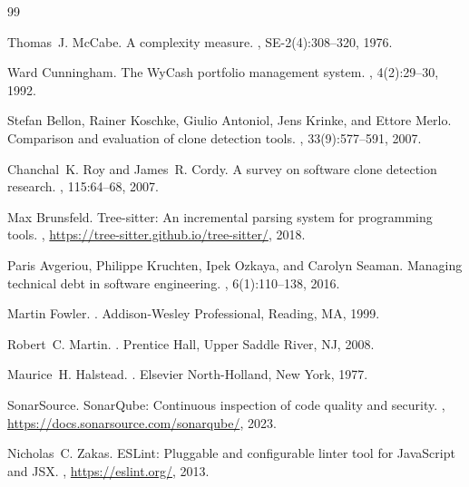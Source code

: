 \documentclass[12pt,a4paper]{report}
\begin{document}
\newpage
\begin{thebibliography}{99}

Thomas~J. McCabe.
\newblock A complexity measure.
, SE-2(4):308--320, 1976.

Ward Cunningham.
\newblock The {WyCash} portfolio management system.
, 4(2):29--30, 1992.

Stefan Bellon, Rainer Koschke, Giulio Antoniol, Jens Krinke, and Ettore Merlo.
\newblock Comparison and evaluation of clone detection tools.
, 33(9):577--591, 2007.

Chanchal~K. Roy and James~R. Cordy.
\newblock A survey on software clone detection research.
, 115:64--68, 2007.

Max Brunsfeld.
\newblock Tree-sitter: An incremental parsing system for programming tools.
, \url{https://tree-sitter.github.io/tree-sitter/}, 2018.

Paris Avgeriou, Philippe Kruchten, Ipek Ozkaya, and Carolyn Seaman.
\newblock Managing technical debt in software engineering.
, 6(1):110--138, 2016.

Martin Fowler.
.
\newblock Addison-Wesley Professional, Reading, MA, 1999.

Robert~C. Martin.
.
\newblock Prentice Hall, Upper Saddle River, NJ, 2008.

Maurice~H. Halstead.
.
\newblock Elsevier North-Holland, New York, 1977.

SonarSource.
\newblock SonarQube: Continuous inspection of code quality and security.
, \url{https://docs.sonarsource.com/sonarqube/}, 2023.

Nicholas~C. Zakas.
\newblock ESLint: Pluggable and configurable linter tool for JavaScript and JSX.
, \url{https://eslint.org/}, 2013.


\end{thebibliography}
\end{document}
